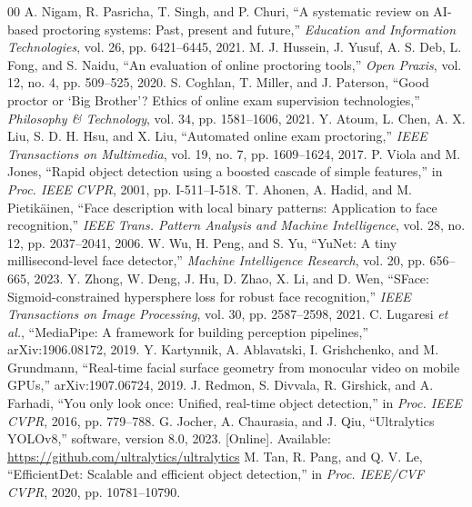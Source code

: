 \documentclass[conference]{IEEEtran}
\begin{document}
\begin{thebibliography}{00}
 A. Nigam, R. Pasricha, T. Singh, and P. Churi, ``A systematic review on AI-based proctoring systems: Past, present and future,'' \emph{Education and Information Technologies}, vol. 26, pp. 6421--6445, 2021.
 M. J. Hussein, J. Yusuf, A. S. Deb, L. Fong, and S. Naidu, ``An evaluation of online proctoring tools,'' \emph{Open Praxis}, vol. 12, no. 4, pp. 509--525, 2020.
 S. Coghlan, T. Miller, and J. Paterson, ``Good proctor or `Big Brother'? Ethics of online exam supervision technologies,'' \emph{Philosophy \& Technology}, vol. 34, pp. 1581--1606, 2021.
 Y. Atoum, L. Chen, A. X. Liu, S. D. H. Hsu, and X. Liu, ``Automated online exam proctoring,'' \emph{IEEE Transactions on Multimedia}, vol. 19, no. 7, pp. 1609--1624, 2017.
 P. Viola and M. Jones, ``Rapid object detection using a boosted cascade of simple features,'' in \emph{Proc. IEEE CVPR}, 2001, pp. I-511--I-518.
 T. Ahonen, A. Hadid, and M. Pietik\"ainen, ``Face description with local binary patterns: Application to face recognition,'' \emph{IEEE Trans. Pattern Analysis and Machine Intelligence}, vol. 28, no. 12, pp. 2037--2041, 2006.
 W. Wu, H. Peng, and S. Yu, ``YuNet: A tiny millisecond-level face detector,'' \emph{Machine Intelligence Research}, vol. 20, pp. 656--665, 2023.
 Y. Zhong, W. Deng, J. Hu, D. Zhao, X. Li, and D. Wen, ``SFace: Sigmoid-constrained hypersphere loss for robust face recognition,'' \emph{IEEE Transactions on Image Processing}, vol. 30, pp. 2587--2598, 2021.
 C. Lugaresi \emph{et al.}, ``MediaPipe: A framework for building perception pipelines,'' arXiv:1906.08172, 2019.
 Y. Kartynnik, A. Ablavatski, I. Grishchenko, and M. Grundmann, ``Real-time facial surface geometry from monocular video on mobile GPUs,'' arXiv:1907.06724, 2019.
 J. Redmon, S. Divvala, R. Girshick, and A. Farhadi, ``You only look once: Unified, real-time object detection,'' in \emph{Proc. IEEE CVPR}, 2016, pp. 779--788.
 G. Jocher, A. Chaurasia, and J. Qiu, ``Ultralytics YOLOv8,'' software, version 8.0, 2023. [Online]. Available: \url{https://github.com/ultralytics/ultralytics}
 M. Tan, R. Pang, and Q. V. Le, ``EfficientDet: Scalable and efficient object detection,'' in \emph{Proc. IEEE/CVF CVPR}, 2020, pp. 10781--10790.
\end{thebibliography}
\end{document}
